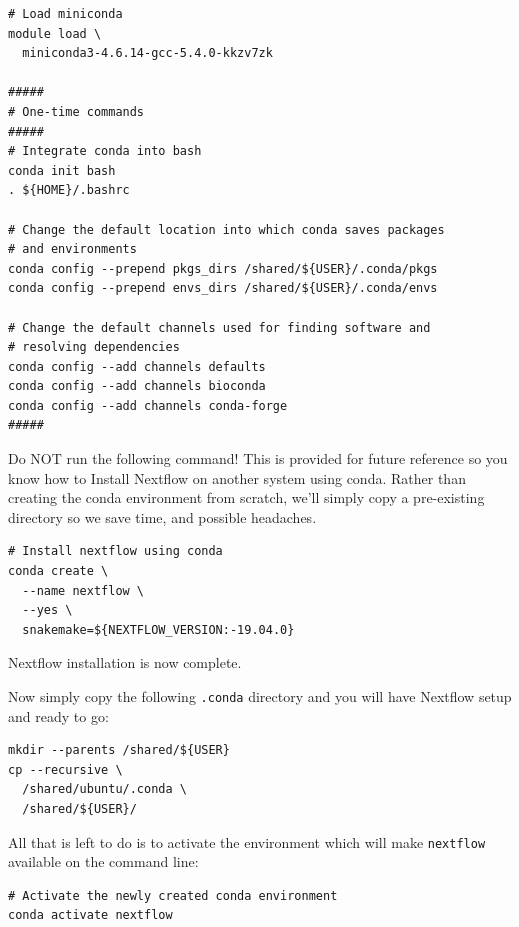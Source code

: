 \begin{steps}
\begin{lstlisting}
# Load miniconda
module load \
  miniconda3-4.6.14-gcc-5.4.0-kkzv7zk

#####
# One-time commands
#####
# Integrate conda into bash
conda init bash
. ${HOME}/.bashrc

# Change the default location into which conda saves packages
# and environments
conda config --prepend pkgs_dirs /shared/${USER}/.conda/pkgs
conda config --prepend envs_dirs /shared/${USER}/.conda/envs

# Change the default channels used for finding software and
# resolving dependencies
conda config --add channels defaults
conda config --add channels bioconda
conda config --add channels conda-forge
#####
\end{lstlisting}

\begin{warning}

Do NOT run the following command! This is provided for future reference so you know how to Install Nextflow on another system using conda. Rather than
creating the conda environment from scratch, we'll simply copy a pre-existing directory so we save time, and possible headaches.

\begin{lstlisting}
# Install nextflow using conda
conda create \
  --name nextflow \
  --yes \
  snakemake=${NEXTFLOW_VERSION:-19.04.0}
\end{lstlisting}

Nextflow installation is now complete.

\end{warning}



Now simply copy the following \texttt{.conda} directory and you
will have Nextflow setup and ready to go:

\begin{lstlisting}
mkdir --parents /shared/${USER}
cp --recursive \
  /shared/ubuntu/.conda \
  /shared/${USER}/
\end{lstlisting}

All that is left to do is to activate the environment which will make \texttt{nextflow} available on the command line:

\begin{lstlisting}
# Activate the newly created conda environment
conda activate nextflow
\end{lstlisting}

\end{steps}






